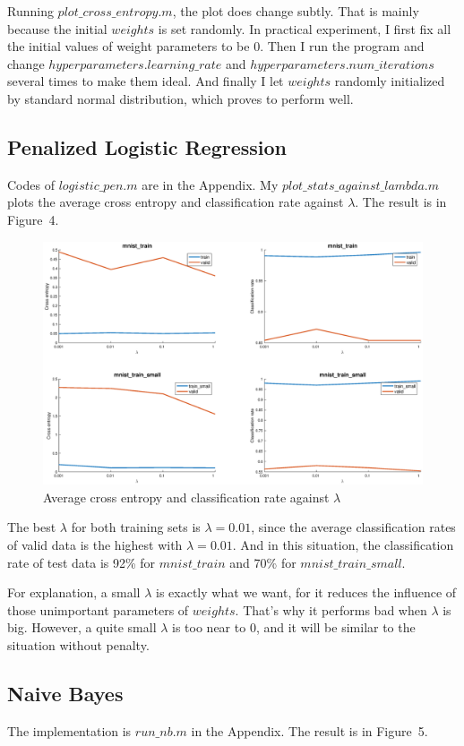 \documentclass{article}
\begin{document}
Running $plot\_cross\_entropy.m$, the plot does change subtly. That is mainly because the initial $weights$ is set randomly. In practical experiment, I first fix all the initial values of weight parameters to be $0$. Then I run the program and change $hyperparameters.learning\_rate$ and $hyperparameters.num\_iterations$ several times to make them ideal. And finally I let $weights$ randomly initialized by standard normal distribution, which proves to perform well.

\subsection{Penalized Logistic Regression}
Codes of $logistic\_pen.m$ are in the Appendix.
My $plot\_stats\_against\_lambda.m$ plots the average cross entropy and classification rate against $\lambda$. The result is in Figure~4.
\begin{figure}
\centering
\includegraphics[scale=0.25]{4.eps}
\caption{Average cross entropy and classification rate against $\lambda$}
\end{figure}
The best $\lambda$ for both training sets is $\lambda=0.01$, since the average classification rates of valid data is the highest with $\lambda=0.01$. And in this situation, the classification rate of test data is 92\% for $mnist\_train$ and 70\% for $mnist\_train\_small$.

For explanation, a small $\lambda$ is exactly what we want, for it reduces the influence of those unimportant parameters of $weights$. That's why it performs bad when $\lambda$ is big. However, a quite small $\lambda$ is too near to $0$, and it will be similar to the situation without penalty.

\subsection{Naive Bayes}
The implementation is $run\_nb.m$ in the Appendix. The result is in Figure~5.
\end{document}
